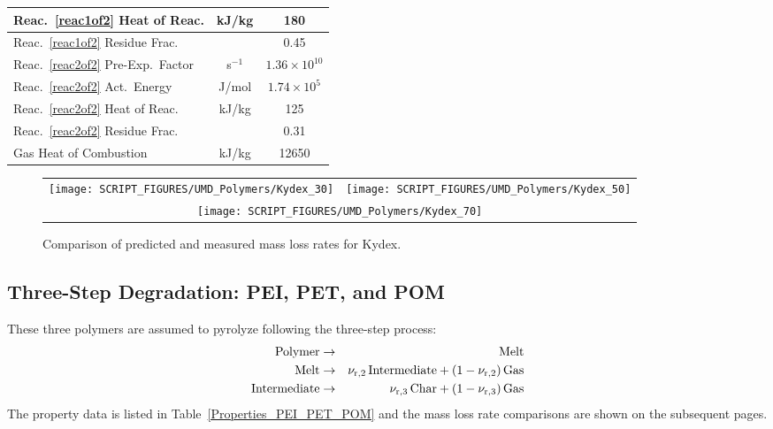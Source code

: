 \begin{table}[!h]
\begin{tabular}{|l|c|c|}
Reac.~\ref{reac1of2} Heat of Reac.       & kJ/kg         & 180                      \\ \hline
Reac.~\ref{reac1of2} Residue Frac.       &               & 0.45                     \\ \hline
Reac.~\ref{reac2of2} Pre-Exp.~Factor     & s$^{-1}$      & $1.36\times 10^{10}$     \\ \hline
Reac.~\ref{reac2of2} Act.~Energy         & J/mol       & $1.74\times 10^5$        \\ \hline
Reac.~\ref{reac2of2} Heat of Reac.       & kJ/kg         & 125                      \\ \hline
Reac.~\ref{reac2of2} Residue Frac.       &               & 0.31                     \\ \hline
Gas Heat of Combustion                   & kJ/kg         & 12650                    \\ \hline
\end{tabular}
\label{Properties_Kydex}
\end{table}

\begin{figure}[p]
\begin{tabular*}{\textwidth}{l@{\extracolsep{\fill}}r}
\texttt{[image: SCRIPT\_FIGURES/UMD\_Polymers/Kydex\_30]} &
\texttt{[image: SCRIPT\_FIGURES/UMD\_Polymers/Kydex\_50]} \\
\multicolumn{2}{c}{\texttt{[image: SCRIPT\_FIGURES/UMD\_Polymers/Kydex\_70]}}
\end{tabular*}
\caption[Mass loss rate of Kydex]
{Comparison of predicted and measured mass loss rates for Kydex.}
\label{Kydex}
\end{figure}

\clearpage

\subsection{Three-Step Degradation: PEI, PET, and POM}

These three polymers are assumed to pyrolyze following the three-step process:
\begin{eqnarray}
   \hbox{Polymer}       &\to& \hbox{Melt}  \label{reac1of3} \\
   \hbox{Melt}          &\to& \nu_{\rm r,2} \, \hbox{Intermediate} + (1-\nu_{\rm r,2}) \, \hbox{Gas}  \label{reac2of3} \\
   \hbox{Intermediate}  &\to& \nu_{\rm r,3} \, \hbox{Char} +         (1-\nu_{\rm r,3}) \, \hbox{Gas}  \label{reac3of3}
\end{eqnarray}
The property data is listed in Table~\ref{Properties_PEI_PET_POM} and the mass loss rate comparisons are shown on the subsequent pages.

